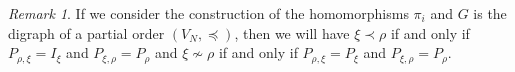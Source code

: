 \documentclass[a4paper,12pt]{extarticle}
\theoremstyle{definition}
\theoremstyle{remark}
\newtheorem{rem}[thm]{Remark}
\begin{document}
\begin{rem}
	If we consider the construction of the homomorphisms $\pi_i$ and $G$ is the digraph of a partial order $(V_N,\preceq)$, then we will have $\xi\prec \rho$ if and only if $P_{\rho, \xi}=I_{\xi}$ and $P_{\xi,\rho}=P_\rho$ 
	and $\xi \nsim \rho$ if and only if $P_{\rho,\xi}=P_\xi$ and $P_{\xi,\rho}=P_\rho$. 
\end{rem}
\end{document}
